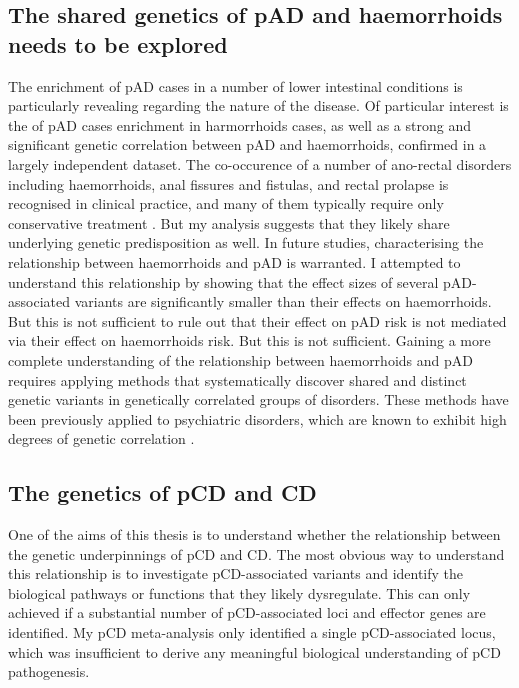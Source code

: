 \subsection{The shared genetics of pAD and haemorrhoids needs to be explored}

The enrichment of pAD cases in a number of lower intestinal conditions is particularly revealing regarding the nature of the disease. Of particular interest is the of pAD cases enrichment in harmorrhoids cases, as well as a strong and significant genetic correlation between pAD and haemorrhoids, confirmed in a largely independent dataset. The co-occurence of a number of ano-rectal disorders including haemorrhoids, anal fissures and fistulas, and rectal prolapse is recognised in clinical practice, and many of them typically require only conservative treatment \cite{Felt-Bersma2009-am,Foxx-Orenstein2014-el}. But my analysis suggests that they likely share underlying genetic predisposition as well. In future studies, characterising the relationship between haemorrhoids and pAD is warranted. I attempted to understand this relationship by showing that the effect sizes of several pAD-associated variants are significantly smaller than their effects on haemorrhoids. But this is not sufficient to rule out that their effect on pAD risk is not mediated via their effect on haemorrhoids risk. But this is not sufficient. Gaining a more complete understanding of the relationship between haemorrhoids and pAD requires applying methods that systematically discover shared and distinct genetic variants in genetically correlated groups of disorders. These methods have been previously applied to psychiatric disorders, which are known to exhibit high degrees of genetic correlation \cite{Grotzinger2022-ak}.  

\subsection{The genetics of pCD and CD}
One of the aims of this thesis is to understand whether the relationship between the genetic underpinnings of pCD and CD. The most obvious way to understand this relationship is to investigate pCD-associated variants and identify the biological pathways or functions that they likely dysregulate. This can only achieved if a substantial number of pCD-associated loci and effector genes are identified. My pCD meta-analysis only identified a single pCD-associated locus, which was insufficient to derive any meaningful biological understanding of pCD pathogenesis.\\

